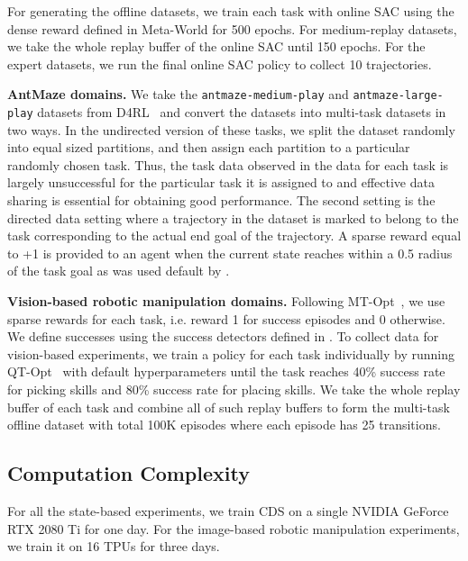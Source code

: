For generating the offline datasets, we train each task with online SAC using the dense reward defined in Meta-World for 500 epochs. For medium-replay datasets, we take the whole replay buffer of the online SAC until 150 epochs. For the expert datasets, we run the final online SAC policy to collect 10 trajectories.

\textbf{AntMaze domains.} We take the \texttt{antmaze-medium-play} and \texttt{antmaze-large-play} datasets from D4RL~\citep{fu2020d4rl} and convert the datasets into multi-task datasets in two ways. In the undirected version of these tasks, we split the dataset randomly into equal sized partitions, and then assign each partition to a particular randomly chosen task. Thus, the task data observed in the data for each task is largely unsuccessful for the particular task it is assigned to and effective data sharing is essential for obtaining good performance. The second setting is the directed data setting where a trajectory in the dataset is marked to belong to the task corresponding to the actual end goal of the trajectory. A sparse reward equal to +1 is provided to an agent when the current state reaches within a 0.5 radius of the task goal as was used default by \citet{fu2020d4rl}. 

\textbf{Vision-based robotic manipulation domains.} Following MT-Opt~\citep{kalashnikov2021mt}, we use sparse rewards for each task, i.e. reward 1 for success episodes and 0 otherwise. We define successes using the success detectors defined in \citep{kalashnikov2021mt}. 
To collect data for vision-based experiments, we train a policy for each task individually by running QT-Opt~\citep{kalashnikov2018scalable} with default hyperparameters until the task reaches 40\% success rate for picking skills and 80\% success rate for placing skills. We take the whole replay buffer of each task and combine all of such replay buffers to form the multi-task offline dataset with total 100K episodes where each episode has 25 transitions.

\subsection{Computation Complexity}
\label{app:compute_details}

For all the state-based experiments, we train CDS on a single NVIDIA GeForce RTX 2080 Ti for one day. For the image-based robotic manipulation experiments, we train it on 16 TPUs for three days.

